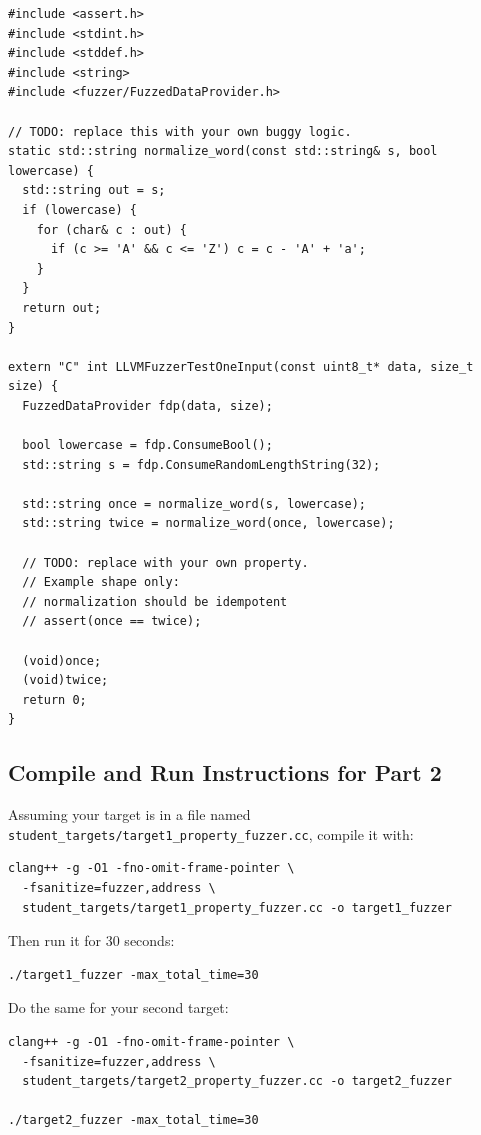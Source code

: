 \documentclass[11pt]{article}
\begin{document}
\begin{lstlisting}[style=cppstyle]
#include <assert.h>
#include <stdint.h>
#include <stddef.h>
#include <string>
#include <fuzzer/FuzzedDataProvider.h>

// TODO: replace this with your own buggy logic.
static std::string normalize_word(const std::string& s, bool lowercase) {
  std::string out = s;
  if (lowercase) {
    for (char& c : out) {
      if (c >= 'A' && c <= 'Z') c = c - 'A' + 'a';
    }
  }
  return out;
}

extern "C" int LLVMFuzzerTestOneInput(const uint8_t* data, size_t size) {
  FuzzedDataProvider fdp(data, size);

  bool lowercase = fdp.ConsumeBool();
  std::string s = fdp.ConsumeRandomLengthString(32);

  std::string once = normalize_word(s, lowercase);
  std::string twice = normalize_word(once, lowercase);

  // TODO: replace with your own property.
  // Example shape only:
  // normalization should be idempotent
  // assert(once == twice);

  (void)once;
  (void)twice;
  return 0;
}
\end{lstlisting}

\subsection*{Compile and Run Instructions for Part 2}
Assuming your target is in a file named \texttt{student\_targets/target1\_property\_fuzzer.cc}, compile it with:

\begin{lstlisting}[style=bashstyle]
clang++ -g -O1 -fno-omit-frame-pointer \
  -fsanitize=fuzzer,address \
  student_targets/target1_property_fuzzer.cc -o target1_fuzzer
\end{lstlisting}

Then run it for 30 seconds:

\begin{lstlisting}[style=bashstyle]
./target1_fuzzer -max_total_time=30
\end{lstlisting}

Do the same for your second target:

\begin{lstlisting}[style=bashstyle]
clang++ -g -O1 -fno-omit-frame-pointer \
  -fsanitize=fuzzer,address \
  student_targets/target2_property_fuzzer.cc -o target2_fuzzer

./target2_fuzzer -max_total_time=30
\end{lstlisting}
\end{document}
